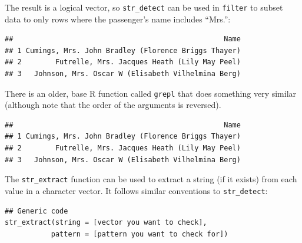 \documentclass[]{book}
\makeatletter
\newenvironment{Shaded}{\begin{snugshade}}{\end{snugshade}}
\newcommand{\KeywordTok}[1]{\textcolor[rgb]{0.13,0.29,0.53}{\textbf{{#1}}}}
\newcommand{\DecValTok}[1]{\textcolor[rgb]{0.00,0.00,0.81}{{#1}}}
\newcommand{\StringTok}[1]{\textcolor[rgb]{0.31,0.60,0.02}{{#1}}}
\newcommand{\NormalTok}[1]{{#1}}
\newenvironment{kframe}{%
\medskip{}
\setlength{\fboxsep}{.8em}
 \def\at@end@of@kframe{}%
 \ifinner\ifhmode%
  \def\at@end@of@kframe{\end{minipage}}%
  \begin{minipage}{\columnwidth}%
 \fi\fi%
 \def\FrameCommand##1{\hskip\@totalleftmargin \hskip-\fboxsep
 \colorbox{shadecolor}{##1}\hskip-\fboxsep
     \hskip-\linewidth \hskip-\@totalleftmargin \hskip\columnwidth}%
 \MakeFramed {\advance\hsize-\width
   \@totalleftmargin\z@ \linewidth\hsize
   \@setminipage}}%
 {\par\unskip\endMakeFramed%
 \at@end@of@kframe}
\renewenvironment{Shaded}{\begin{kframe}}{\end{kframe}}
\makeatother
\begin{document}
The result is a logical vector, so \texttt{str\_detect} can be used in
\texttt{filter} to subset data to only rows where the passenger's name
includes ``Mrs.'':

\begin{Shaded}
\end{Shaded}

\begin{verbatim}
##                                                  Name
## 1 Cumings, Mrs. John Bradley (Florence Briggs Thayer)
## 2        Futrelle, Mrs. Jacques Heath (Lily May Peel)
## 3   Johnson, Mrs. Oscar W (Elisabeth Vilhelmina Berg)
\end{verbatim}

There is an older, base R function called \texttt{grepl} that does
something very similar (although note that the order of the arguments is
reversed).

\begin{Shaded}
\end{Shaded}

\begin{verbatim}
##                                                  Name
## 1 Cumings, Mrs. John Bradley (Florence Briggs Thayer)
## 2        Futrelle, Mrs. Jacques Heath (Lily May Peel)
## 3   Johnson, Mrs. Oscar W (Elisabeth Vilhelmina Berg)
\end{verbatim}

The \texttt{str\_extract} function can be used to extract a string (if
it exists) from each value in a character vector. It follows similar
conventions to \texttt{str\_detect}:

\begin{verbatim}
## Generic code
str_extract(string = [vector you want to check], 
           pattern = [pattern you want to check for])
\end{verbatim}
\end{document}
